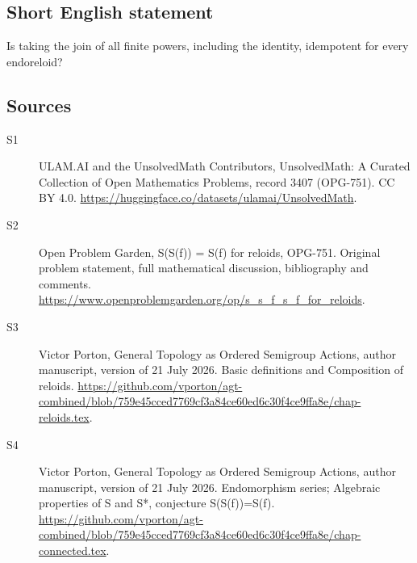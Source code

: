 \documentclass[11pt]{article}
\begin{document}
\subsection{Short English statement}
Is taking the join of all finite powers, including the identity, idempotent for every endoreloid?
\subsection{Sources}
\begin{description}
\item[\hypertarget{source:3407:1}{S1}] ULAM.AI and the UnsolvedMath Contributors, UnsolvedMath: A Curated Collection of Open Mathematics Problems, record 3407 (OPG-751). CC BY 4.0. \url{https://huggingface.co/datasets/ulamai/UnsolvedMath}.
\item[\hypertarget{source:3407:2}{S2}] Open Problem Garden, S(S(f)) = S(f) for reloids, OPG-751. Original problem statement, full mathematical discussion, bibliography and comments. \url{https://www.openproblemgarden.org/op/s_s_f_s_f_for_reloids}.
\item[\hypertarget{source:3407:3}{S3}] Victor Porton, General Topology as Ordered Semigroup Actions, author manuscript, version of 21 July 2026. Basic definitions and Composition of reloids. \url{https://github.com/vporton/agt-combined/blob/759e45cced7769cf3a84ce60ed6c30f4ce9ffa8e/chap-reloids.tex}.
\item[\hypertarget{source:3407:4}{S4}] Victor Porton, General Topology as Ordered Semigroup Actions, author manuscript, version of 21 July 2026. Endomorphism series; Algebraic properties of S and S*, conjecture S(S(f))=S(f). \url{https://github.com/vporton/agt-combined/blob/759e45cced7769cf3a84ce60ed6c30f4ce9ffa8e/chap-connected.tex}.
\end{description}
\label{end:3407}
\end{document}
